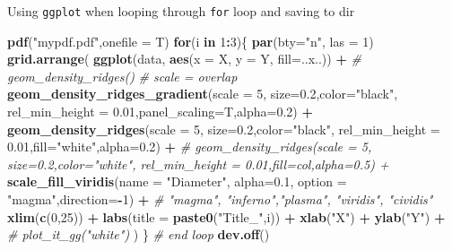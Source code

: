 \documentclass[10,portrait]{article}
\newenvironment{Shaded}{\begin{snugshade}}{\end{snugshade}}
\newcommand{\KeywordTok}[1]{\textcolor[rgb]{0.13,0.29,0.53}{\textbf{#1}}}
\newcommand{\DataTypeTok}[1]{\textcolor[rgb]{0.13,0.29,0.53}{#1}}
\newcommand{\DecValTok}[1]{\textcolor[rgb]{0.00,0.00,0.81}{#1}}
\newcommand{\FloatTok}[1]{\textcolor[rgb]{0.00,0.00,0.81}{#1}}
\newcommand{\StringTok}[1]{\textcolor[rgb]{0.31,0.60,0.02}{#1}}
\newcommand{\CommentTok}[1]{\textcolor[rgb]{0.56,0.35,0.01}{\textit{#1}}}
\newcommand{\ControlFlowTok}[1]{\textcolor[rgb]{0.13,0.29,0.53}{\textbf{#1}}}
\newcommand{\OperatorTok}[1]{\textcolor[rgb]{0.81,0.36,0.00}{\textbf{#1}}}
\newcommand{\NormalTok}[1]{#1}
\begin{document}
Using \texttt{ggplot} when looping through \texttt{for} loop and saving
to dir

\begin{Shaded}
\begin{Highlighting}[]
\KeywordTok{pdf}\NormalTok{(}\StringTok{"mypdf.pdf"}\NormalTok{,}\DataTypeTok{onefile =}\NormalTok{ T)}
\ControlFlowTok{for}\NormalTok{(i }\ControlFlowTok{in} \DecValTok{1}\OperatorTok{:}\DecValTok{3}\NormalTok{)\{ }
\KeywordTok{par}\NormalTok{(}\DataTypeTok{bty=}\StringTok{"n"}\NormalTok{, }\DataTypeTok{las =} \DecValTok{1}\NormalTok{)}
  \KeywordTok{grid.arrange}\NormalTok{( }
  \KeywordTok{ggplot}\NormalTok{(data, }\KeywordTok{aes}\NormalTok{(}\DataTypeTok{x =}\NormalTok{ X, }\DataTypeTok{y =}\NormalTok{ Y, }\DataTypeTok{fill=}\NormalTok{..x..)) }\OperatorTok{+}\StringTok{ }\CommentTok{# geom_density_ridges()}
\StringTok{    }\CommentTok{# scale = overlap}
\StringTok{    }\KeywordTok{geom_density_ridges_gradient}\NormalTok{(}\DataTypeTok{scale =} \DecValTok{5}\NormalTok{, }\DataTypeTok{size=}\FloatTok{0.2}\NormalTok{,}\DataTypeTok{color=}\StringTok{"black"}\NormalTok{, }\DataTypeTok{rel_min_height =} \FloatTok{0.01}\NormalTok{,}\DataTypeTok{panel_scaling=}\NormalTok{T,}\DataTypeTok{alpha=}\FloatTok{0.2}\NormalTok{) }\OperatorTok{+}
\StringTok{    }\KeywordTok{geom_density_ridges}\NormalTok{(}\DataTypeTok{scale =} \DecValTok{5}\NormalTok{, }\DataTypeTok{size=}\FloatTok{0.2}\NormalTok{,}\DataTypeTok{color=}\StringTok{"black"}\NormalTok{, }\DataTypeTok{rel_min_height =} \FloatTok{0.01}\NormalTok{,}\DataTypeTok{fill=}\StringTok{"white"}\NormalTok{,}\DataTypeTok{alpha=}\FloatTok{0.2}\NormalTok{) }\OperatorTok{+}
\StringTok{    }\CommentTok{# geom_density_ridges(scale = 5, size=0.2,color="white", rel_min_height = 0.01,fill=col,alpha=0.5) +}
\StringTok{    }\KeywordTok{scale_fill_viridis}\NormalTok{(}\DataTypeTok{name =} \StringTok{"Diameter"}\NormalTok{, }\DataTypeTok{alpha=}\FloatTok{0.1}\NormalTok{, }\DataTypeTok{option =} \StringTok{"magma"}\NormalTok{,}\DataTypeTok{direction=}\OperatorTok{-}\DecValTok{1}\NormalTok{) }\OperatorTok{+}\StringTok{ }\CommentTok{# "magma", "inferno","plasma", "viridis", "cividis"}
\StringTok{    }\KeywordTok{xlim}\NormalTok{(}\KeywordTok{c}\NormalTok{(}\DecValTok{0}\NormalTok{,}\DecValTok{25}\NormalTok{)) }\OperatorTok{+}
\StringTok{    }\KeywordTok{labs}\NormalTok{(}\DataTypeTok{title =} \KeywordTok{paste0}\NormalTok{(}\StringTok{"Title_"}\NormalTok{,i)) }\OperatorTok{+}
\StringTok{    }\KeywordTok{xlab}\NormalTok{(}\StringTok{"X"}\NormalTok{) }\OperatorTok{+}
\StringTok{    }\KeywordTok{ylab}\NormalTok{(}\StringTok{"Y"}\NormalTok{) }\OperatorTok{+}
\StringTok{    }\CommentTok{# plot_it_gg("white")}
\StringTok{  }\NormalTok{)}
\NormalTok{\} }\CommentTok{# end loop }
\KeywordTok{dev.off}\NormalTok{()}
\end{Highlighting}
\end{Shaded}
\end{document}
